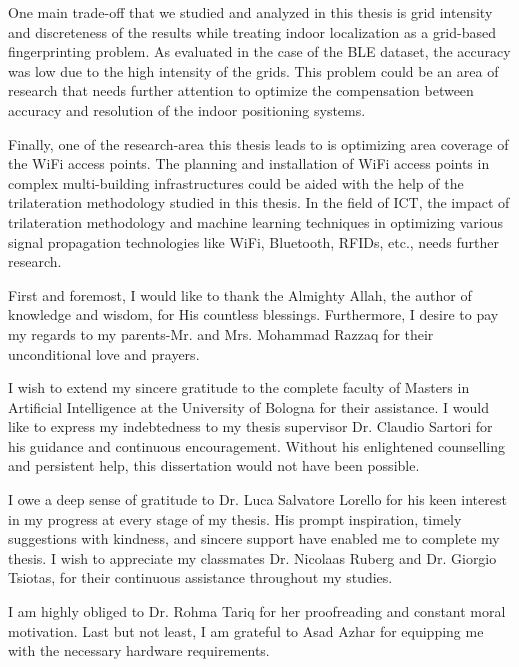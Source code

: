 \documentclass[a4paper,singleside,12pt]{report} %
\begin{document}
			One main trade-off that we studied and analyzed in this thesis is grid intensity and discreteness of the results while treating indoor localization as a grid-based fingerprinting problem. 
			As evaluated in the case of the BLE dataset, the accuracy was low due to the high intensity of the grids.
			This problem could be an area of research that needs further attention to optimize the compensation between accuracy and resolution of the indoor positioning systems. 
			
			Finally, one of the research-area this thesis leads to is optimizing area coverage of the WiFi access points. 
			The planning and installation of WiFi access points in complex multi-building infrastructures could be aided with the help of the trilateration methodology studied in this thesis. 
			In the field of ICT, the impact of trilateration methodology and machine learning techniques in optimizing various signal propagation technologies like WiFi, Bluetooth, RFIDs, etc., needs further research.  


	\appendix
	
	\printbibliography[heading=bibintoc] %

	
	\acknowledgements
		First and foremost, I would like to thank the Almighty Allah, the author of knowledge and wisdom, for His countless blessings. 
		Furthermore, I desire to pay my regards to my parents-Mr. and Mrs. Mohammad Razzaq for their unconditional love and prayers.
  
		I wish to extend my sincere gratitude to the complete faculty of Masters in Artificial Intelligence at the University of Bologna for their assistance. 
		I would like to express my indebtedness to my thesis supervisor Dr. Claudio Sartori for his guidance and continuous encouragement. 
		Without his enlightened counselling and persistent help, this dissertation would not have been possible.
		
		I owe a deep sense of gratitude to Dr. Luca Salvatore Lorello for his keen interest in my progress at every stage of my thesis. 
		His prompt inspiration, timely suggestions with kindness, and sincere support have enabled me to complete my thesis. 
		I wish to appreciate my classmates Dr. Nicolaas Ruberg and Dr. Giorgio Tsiotas, for their continuous assistance throughout my studies. 
		
		I am highly obliged to Dr. Rohma Tariq for her proofreading and constant moral motivation. 
		Last but not least, I am grateful to Asad Azhar for equipping me with the necessary hardware requirements.  
		
\end{document}
